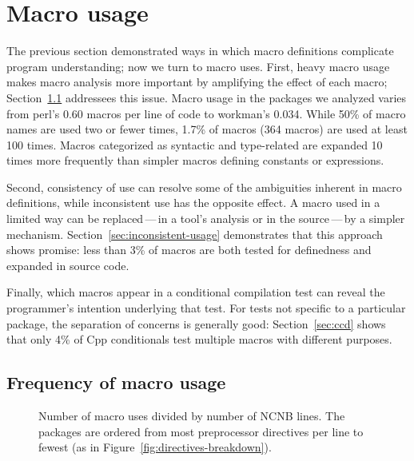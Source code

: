 \documentclass[10pt]{article}
\newcommand{\pkg}[1]{\textsf{#1}}
\newcommand{\captionsmall}[1]{\caption[]{\small #1}}
\begin{document}
\section{Macro usage}


The previous section demonstrated ways in which macro definitions
complicate program understanding; now we turn to macro uses.  First, heavy
macro usage makes macro analysis more important by amplifying the effect of
each macro; Section~\ref{sec:macro-usage} addressees this issue.  Macro
usage in the packages we analyzed varies from
\pkg{perl}'s 0.60 macros per line of code to \pkg{workman}'s 0.034.  While
50\% of macro names are used two or fewer times, 1.7\% of macros (364
macros) are used at least 100 times.  Macros categorized as syntactic and
type-related are expanded 10 times more frequently than simpler macros
defining constants or expressions.

Second, consistency of use can resolve
some of the ambiguities inherent in macro definitions, while inconsistent
use has the opposite effect.  A macro used in a limited way can be
replaced\,---\,in a tool's analysis or in the source\,---\,by a simpler
mechanism.  Section~\ref{sec:inconsistent-usage} demonstrates that this
approach shows promise:  less than 3\% of macros are both tested for
definedness and expanded in source code.

Finally, which macros appear in a
conditional compilation test can reveal the programmer's intention underlying
that test.  For tests not specific to a particular package, the separation
of concerns is generally good:  Section~\ref{sec:ccd} shows that only 4\%
of Cpp conditionals test multiple macros with different purposes.


\subsection{Frequency of macro usage}
\label{sec:macro-usage}

\begin{figure}
\centerline{}
\captionsmall{Number of macro uses divided by number of NCNB lines.
  The packages are ordered from most preprocessor directives per line to
  fewest (as in Figure~\ref{fig:directives-breakdown}).}
\label{fig:use-per-line}
\end{figure}
\end{document}
